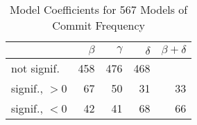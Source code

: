 
\begin{table}[t] \centering
\small
  \caption{Model Coefficients for 567 Models of Commit Frequency}
  \label{Table:rddmodels_freq}
\begin{tabular}{ l  r r r r }        
\hline 

 & $\beta$ & $\gamma$ & $\delta$ & $\beta + \delta$ \\ 
 \hline 
 \hline
not signif. & 458 & 476 & 468 & \\
\hline
signif., $>0$ & 67 & 50 & 31 & 33 \\
\hline
signif., $<0$ & 42 & 41 & 68 & 66 \\
\hline
\end{tabular}
\end{table}